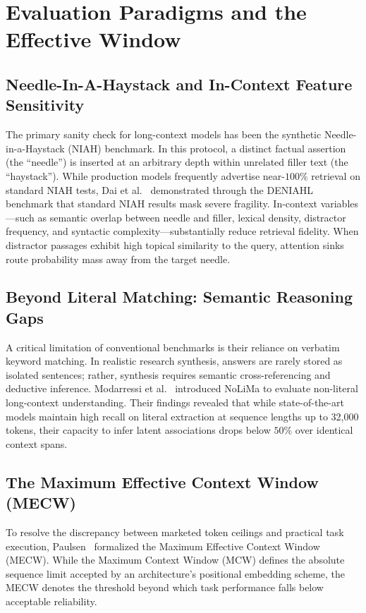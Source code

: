 \documentclass[manuscript]{acmart}
\begin{document}
\section{Evaluation Paradigms and the Effective Window}\label{sec:eval_frameworks}

\subsection{Needle-In-A-Haystack and In-Context Feature Sensitivity}
The primary sanity check for long-context models has been the synthetic Needle-in-a-Haystack (NIAH) benchmark. In this protocol, a distinct factual assertion (the ``needle'') is inserted at an arbitrary depth within unrelated filler text (the ``haystack''). While production models frequently advertise near-$100\%$ retrieval on standard NIAH tests, Dai et al.~\cite{dai2024deniahl} demonstrated through the DENIAHL benchmark that standard NIAH results mask severe fragility. In-context variables---such as semantic overlap between needle and filler, lexical density, distractor frequency, and syntactic complexity---substantially reduce retrieval fidelity. When distractor passages exhibit high topical similarity to the query, attention sinks route probability mass away from the target needle.

\subsection{Beyond Literal Matching: Semantic Reasoning Gaps}
A critical limitation of conventional benchmarks is their reliance on verbatim keyword matching. In realistic research synthesis, answers are rarely stored as isolated sentences; rather, synthesis requires semantic cross-referencing and deductive inference. Modarressi et al.~\cite{modarressi2025nolima} introduced NoLiMa to evaluate non-literal long-context understanding. Their findings revealed that while state-of-the-art models maintain high recall on literal extraction at sequence lengths up to 32,000 tokens, their capacity to infer latent associations drops below $50\%$ over identical context spans.

\subsection{The Maximum Effective Context Window (MECW)}
To resolve the discrepancy between marketed token ceilings and practical task execution, Paulsen~\cite{paulsen2025mecw} formalized the Maximum Effective Context Window (MECW). While the Maximum Context Window (MCW) defines the absolute sequence limit accepted by an architecture's positional embedding scheme, the MECW denotes the threshold beyond which task performance falls below acceptable reliability. 
\end{document}
